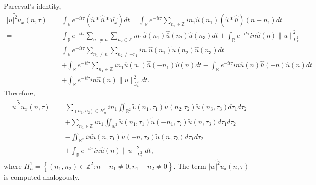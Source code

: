\documentclass[reqno]{amsart}
\numberwithin{equation}{section}
\begin{document}
Parceval's identity,
\begin{equation*}
\begin{split}
\widetilde{| u| ^{2}u_{x}}(n,\tau)  =&
{\displaystyle\int\nolimits_{\mathbb{R}}} e^{-it\tau}\left(
\widehat{u}\ast\widehat{\overline{u}}\ast\widehat{u_{x} }\right)
dt ={\displaystyle\int\nolimits_{\mathbb{R}}}
e^{-it\tau}\sum\limits_{n_{1}\in\mathbb{Z}}in_{1}\widehat{u}(n_{1})\left(
\widehat{u}\ast\widehat{\overline{u}}\right)  (n-n_{1})dt \nonumber\\
=&{\displaystyle\int\nolimits_{\mathbb{R}}}
e^{-it\tau}\sum\limits_{n_{1}\neq n}\sum\limits_{n_{2}\in\mathbb{Z}}
in_{1}\widehat{u}(n_{1})\widehat{\overline{u}}(n_{2})\widehat{u}(n_3)dt +
{\displaystyle\int\nolimits_{\mathbb{R}}}
e^{-it\tau}in\widehat{u}(n)\| u\| _{L_{x}^{2}}^{2}\\
=&
{\displaystyle\int\nolimits_{\mathbb{R}}}
e^{-it\tau}\sum\limits_{n_{1}\neq n}\sum\limits_{n_{2}\neq-n_{1}}
in_{1}\widehat{u}(n_{1})\widehat{\overline{u}}(n_{2})\widehat{u}(n_3)dt\\
&+{\displaystyle\int\nolimits_{\mathbb{R}}}
e^{-it\tau}\sum\limits_{n_{1}\in\mathbb{Z}}in_{1}\widehat{u}(n_{1})\widehat{\overline{u}}(-n_{1})
\widehat{u}(n)dt-{\displaystyle\int\nolimits_{\mathbb{R}}}
e^{-it\tau}in\widehat{u}(n)\widehat{\overline{u}}(-n)\widehat{u}(n)dt\\
& +{\displaystyle\int\nolimits_{\mathbb{R}}}
e^{-it\tau}in\widehat{u}(n)\| u\| _{L_{x}^{2}}^{2}dt.
\end{split}
\end{equation*}
Therefore,
\begin{equation}\label{4.24}
\begin{split}
\widetilde{| u| ^{2}u_{x}}(n,\tau)=&\sum\limits_{(n_{1},n_{2})\in
H_{n}^{1}}
in_{1}\iint\nolimits_{\mathbb{R}^{2}}\widetilde{u}(n_{1},\tau_{1})
\widetilde{\overline{u}}(n_{2},\tau_{2})\widetilde{u}(n_3,\tau_3)d\tau_{1}d\tau_{2}\\
& +\sum\limits_{n_{1}\in\mathbb{Z}}in_{1}\iint\nolimits_{\mathbb{R}^{2}}
\widetilde{u}(n_{1},\tau_{1})\widetilde{\overline{u}}(-n_{1},\tau_{2})
\widetilde{u}(n,\tau_3)d\tau_{1}d\tau_{2}\\
& -\iint\nolimits_{\mathbb{R}^{2}}in\widetilde{u}(n,\tau_{1})\widetilde
{\overline{u}}(-n,\tau_{2})\widetilde{u}(n,\tau_3)d\tau_{1}d\tau_{2}\\
& +{\displaystyle\int\nolimits_{\mathbb{R}}}
e^{-it\tau}in\widehat{u}(n)\| u\| _{L_{x}^{2}}^{2}dt,
\end{split}
\end{equation}
where
$H_{n}^{1}=\left\{  \left(  n_{1},n_{2}\right)  \in\mathbb{Z}^{2}:n-n_{1}\neq0,n_{1}+n_{2}\neq0\right\}  \text{.}$
The term $\widetilde{|w| ^{2}u_{x}}(n,\tau)$ is computed analogously.
\end{document}
